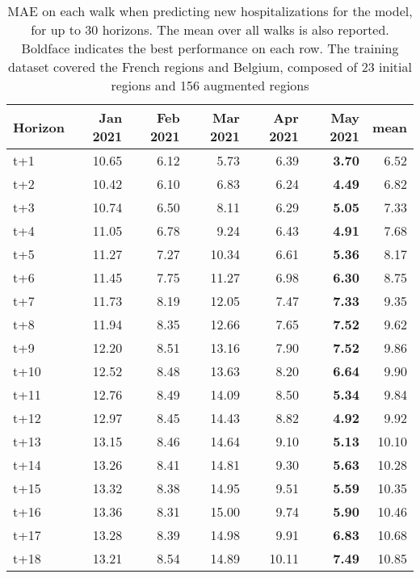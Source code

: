 \begin{table}[H]
\centering
\caption{MAE on each walk when predicting new hospitalizations for the model, for up to 30 horizons. The mean over all walks is also reported. Boldface indicates the best performance on each row. The training dataset covered the French regions and Belgium, composed of 23 initial regions and 156 augmented regions }
\label{tab:MAE_walk_encoder_decoder}
\begin{tabular}{lrrrrrr}
\toprule
Horizon &  Jan 2021 &  Feb 2021 &  Mar 2021 &  Apr 2021 &  May 2021 &  mean \\
\midrule
t+1  & 10.65  & 6.12  & 5.73  & 6.39  & \textbf{3.70}  & 6.52  \\
t+2  & 10.42  & 6.10  & 6.83  & 6.24  & \textbf{4.49}  & 6.82  \\
t+3  & 10.74  & 6.50  & 8.11  & 6.29  & \textbf{5.05}  & 7.33  \\
t+4  & 11.05  & 6.78  & 9.24  & 6.43  & \textbf{4.91}  & 7.68  \\
t+5  & 11.27  & 7.27  & 10.34  & 6.61  & \textbf{5.36}  & 8.17  \\
t+6  & 11.45  & 7.75  & 11.27  & 6.98  & \textbf{6.30}  & 8.75  \\
t+7  & 11.73  & 8.19  & 12.05  & 7.47  & \textbf{7.33}  & 9.35  \\
t+8  & 11.94  & 8.35  & 12.66  & 7.65  & \textbf{7.52}  & 9.62  \\
t+9  & 12.20  & 8.51  & 13.16  & 7.90  & \textbf{7.52}  & 9.86  \\
t+10  & 12.52  & 8.48  & 13.63  & 8.20  & \textbf{6.64}  & 9.90  \\
t+11  & 12.76  & 8.49  & 14.09  & 8.50  & \textbf{5.34}  & 9.84  \\
t+12  & 12.97  & 8.45  & 14.43  & 8.82  & \textbf{4.92}  & 9.92  \\
t+13  & 13.15  & 8.46  & 14.64  & 9.10  & \textbf{5.13}  & 10.10  \\
t+14  & 13.26  & 8.41  & 14.81  & 9.30  & \textbf{5.63}  & 10.28  \\
t+15  & 13.32  & 8.38  & 14.95  & 9.51  & \textbf{5.59}  & 10.35  \\
t+16  & 13.36  & 8.31  & 15.00  & 9.74  & \textbf{5.90}  & 10.46  \\
t+17  & 13.28  & 8.39  & 14.98  & 9.91  & \textbf{6.83}  & 10.68  \\
t+18  & 13.21  & 8.54  & 14.89  & 10.11  & \textbf{7.49}  & 10.85  \\

\end{tabular}
\end{table}
